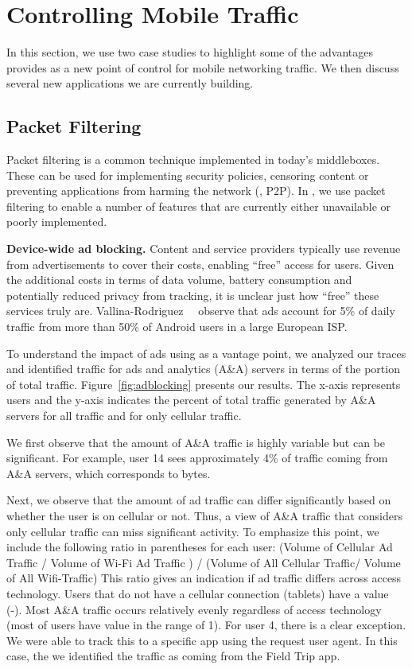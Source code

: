 \section{Controlling Mobile Traffic}
In this section, we use two case studies to highlight some of the 
advantages \meddle provides as a new point of control 
for mobile networking traffic. We then discuss several new applications 
we are currently building.

\subsection{Packet Filtering}
Packet filtering is a common technique implemented in 
today's middleboxes. These can be used for implementing 
security policies, censoring content or preventing applications 
from harming the network (\eg, P2P). In \meddle, we use 
packet filtering to enable a number of features that are 
currently either unavailable or poorly implemented.

\noindent\textbf{Device-wide ad blocking.} Content and service providers 
typically use revenue from advertisements to cover their costs, enabling 
``free'' access for users. Given the additional costs in terms of data volume, 
battery consumption and potentially reduced privacy from tracking, it is unclear 
just how ``free'' these services truly are. Vallina-Rodriguez~\etal~\cite{Vallina-rodriguez:2012:AdCache} observe
that ads account for 5\% of daily traffic from more than 50\% of
Android users in a large European ISP. 

To understand the impact of ads using \meddle as a vantage point, we 
analyzed our traces and identified traffic for ads and analytics (A\&A) servers 
in terms of the portion of total traffic. Figure~\ref{fig:adblocking} presents our 
results. The x-axis represents users and the y-axis indicates the percent of 
total traffic generated by A\&A servers for all traffic and for only cellular traffic. 

We first observe that the amount of A\&A traffic is highly variable but can be 
significant. For example, user 14 sees approximately 4\% of traffic coming 
from A\&A servers, which corresponds to  bytes. 

Next, we observe that the amount of ad traffic can differ significantly 
based on whether the user is on cellular or not. Thus, a view of A\&A 
traffic that considers only cellular traffic can miss significant activity. 
To emphasize this point, we include the following ratio in parentheses 
for each user: 
(Volume of Cellular Ad Traffic / Volume of Wi-Fi Ad Traffic ) / (Volume of All Cellular Traffic/ Volume of All Wifi-Traffic)
This ratio gives an indication if ad traffic differs across access technology.
Users that do not have a cellular connection (tablets) have a value (-).
Most A\&A traffic occurs relatively evenly regardless of access technology (most of users have value in the range of 1).
For user 4, there is a clear exception. We were able to track this to a 
specific app using the request user agent. In this case, the we identified the traffic as 
coming from the Field Trip app.  



